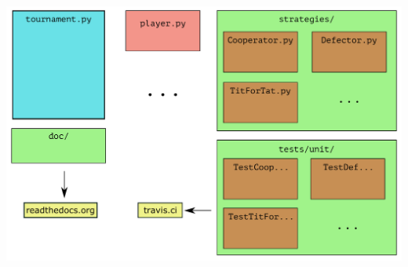 \documentclass{beamer}
\begin{document}



\begin{frame}
    \centering
    \includegraphics[width=\textwidth]{static/outline_of_library.pdf}
\end{frame}





\end{document}
